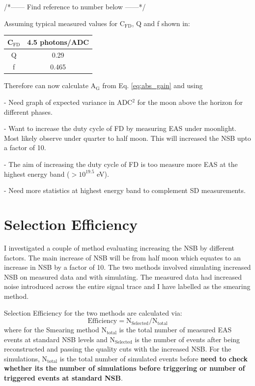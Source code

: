 /*------ Find reference to number below ------*/

Assuming typical measured values for C$_{\mathrm{FD}}$, Q and f shown in:

\begin{center}
\begin{tabular}{|c|c|}
\hline
C$_{\mathrm{FD}}$ & 4.5 photons/ADC \\
\hline
Q & 0.29 \\
\hline
f & 0.465 \\
\hline
\end{tabular}
\end{center}

Therefore can now calculate A$_{\mathrm{G}}$ from Eq. \ref{eq:abs_gain} and using 

- Need graph of expected variance in ADC$^2$ for the moon above the horizon for different phases.

- Want to increase the duty cycle of FD by measuring EAS under moonlight. Most likely observe under quarter to half moon. This will increased the NSB upto a factor of 10.

- The aim of increasing the duty cycle of FD is too measure more EAS at the highest energy band ($> 10^{19.5}$ eV).

- Need more statistics at highest energy band to complement SD measurements.


\section{Selection Efficiency}

I investigated a couple of method evaluating increasing the NSB by different factors. The main increase of NSB will be from half moon which equates to an increase in NSB by a factor of 10. The two methods involved simulating increased NSB on measured data and with simulating. The measured data had increased noise introduced across the entire signal trace and I have labelled as the smearing method.

Selection Efficiency for the two methods are calculated via:
\begin{equation}
\mathrm{Efficiency} = \mathrm{N}_{\mathrm{Selected}} / \mathrm{N}_{\mathrm{total}}
\end{equation}
where for the Smearing method N$_{\mathrm{total}}$ is the total number of measured EAS events at standard NSB levels and N$_{\mathrm{Selected}}$ is the number of events after being reconstructed and passing the quality cuts with the increased NSB. For the simulations, N$_{\mathrm{total}}$ is the total number of simulated events before \textbf{need to check whether its the number of simulations before triggering or number of triggered events at standard NSB}.

